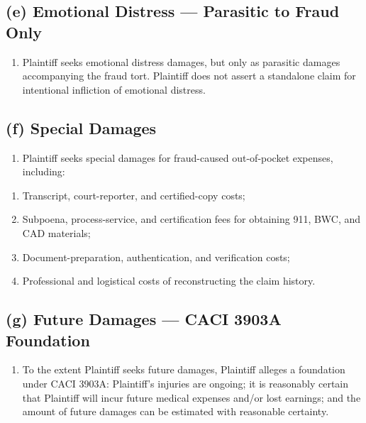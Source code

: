 \subsection{(e) Emotional Distress --- Parasitic to Fraud Only}\label{e-emotional-distress-parasitic-to-fraud-only}

\begin{enumerate}
\def\labelenumi{\arabic{enumi}.}
\setcounter{enumi}{34}
\tightlist
\item
  Plaintiff seeks emotional distress damages, but only as parasitic damages accompanying the fraud tort. Plaintiff does not assert a standalone claim for intentional infliction of emotional distress.
\end{enumerate}

\subsection{(f) Special Damages}\label{f-special-damages}

\begin{enumerate}
\def\labelenumi{\arabic{enumi}.}
\setcounter{enumi}{35}
\tightlist
\item
  Plaintiff seeks special damages for fraud-caused out-of-pocket expenses, including:
\end{enumerate}

\begin{enumerate}
\def\labelenumi{(\alph{enumi})}
\tightlist
\item
  Transcript, court-reporter, and certified-copy costs;
\item
  Subpoena, process-service, and certification fees for obtaining 911, BWC, and CAD materials;
\item
  Document-preparation, authentication, and verification costs;
\item
  Professional and logistical costs of reconstructing the claim history.
\end{enumerate}

\subsection{(g) Future Damages --- CACI 3903A Foundation}\label{g-future-damages-caci-3903a-foundation}

\begin{enumerate}
\def\labelenumi{\arabic{enumi}.}
\setcounter{enumi}{36}
\tightlist
\item
  To the extent Plaintiff seeks future damages, Plaintiff alleges a foundation under CACI 3903A: Plaintiff's injuries are ongoing; it is reasonably certain that Plaintiff will incur future medical expenses and/or lost earnings; and the amount of future damages can be estimated with reasonable certainty.
\end{enumerate}

